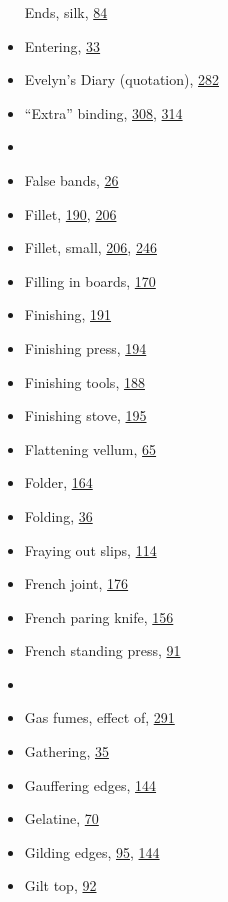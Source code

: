\documentclass[
]{article}
\begin{document}
\begin{itemize}
  Ends, silk, \protect\hyperlink{Page_84}{84}
\item
  Entering, \protect\hyperlink{Page_33}{33}
\item
  Evelyn's Diary (quotation), \protect\hyperlink{Page_282}{282}
\item
  ``Extra'' binding, \protect\hyperlink{Page_308}{308},
  \protect\hyperlink{Page_314}{314}
\item
  ~
\item
  {False} bands, \protect\hyperlink{Page_26}{26}
\item
  Fillet, \protect\hyperlink{Page_190}{190},
  \protect\hyperlink{Page_206}{206}
\item
  Fillet, small, \protect\hyperlink{Page_206}{206},
  \protect\hyperlink{Page_246}{246}
\item
  Filling in boards, \protect\hyperlink{Page_170}{170}
\item
  Finishing, \protect\hyperlink{Page_191}{191}
\item
  Finishing press, \protect\hyperlink{Page_194}{194}
\item
  Finishing tools, \protect\hyperlink{Page_188}{188}
\item
  Finishing stove, \protect\hyperlink{Page_195}{195}
\item
  Flattening vellum, \protect\hyperlink{Page_65}{65}
\item
  Folder, \protect\hyperlink{Page_164}{164}
\item
  Folding, \protect\hyperlink{Page_36}{36}
\item
  Fraying out slips, \protect\hyperlink{Page_114}{114}
\item
  French joint, \protect\hyperlink{Page_176}{176}
\item
  French paring knife, \protect\hyperlink{Page_156}{156}
\item
  French standing press, \protect\hyperlink{Page_91}{91}
\item
  ~
\item
  {Gas} fumes, effect of, \protect\hyperlink{Page_291}{291}
\item
  Gathering, \protect\hyperlink{Page_35}{35}
\item
  Gauffering edges, \protect\hyperlink{Page_144}{144}
\item
  Gelatine, \protect\hyperlink{Page_70}{70}
\item
  Gilding edges, \protect\hyperlink{Page_95}{95},
  \protect\hyperlink{Page_144}{144}
\item
  Gilt top, \protect\hyperlink{Page_92}{92}

\end{itemize}
\end{document}
